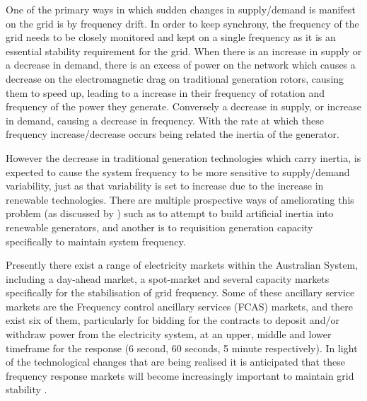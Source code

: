 One of the primary ways in which sudden changes in supply/demand is manifest on the grid is by frequency drift.
In order to keep synchrony, the frequency of the grid needs to be closely monitored and kept on a single frequency as it is an essential stability requirement for the grid.
When there is an increase in supply or a decrease in demand, there is an excess of power on the network which causes a decrease on the electromagnetic drag on traditional generation rotors, causing them to speed up, leading to a increase in their frequency of rotation and frequency of the power they generate.
Conversely a decrease in supply, or increase in demand, causing a decrease in frequency. With the rate at which these frequency increase/decrease occurs being related the inertia of the generator.

However the decrease in traditional generation technologies which carry inertia, is expected to cause the system frequency to be more sensitive to supply/demand variability, just as that variability is set to increase due to the increase in renewable technologies.
There are multiple prospective ways of ameliorating this problem (as discussed by \cite{doi:10.1002/2050-7038.12128}) such as to attempt to build artificial inertia into renewable generators, and another is to requisition generation capacity specifically to maintain system frequency.

Presently there exist a range of electricity markets within the Australian System, including a day-ahead market, a spot-market and several capacity markets specifically for the stabilisation of grid frequency.
Some of these ancillary service markets are the Frequency control ancillary services (FCAS) markets, and there exist six of them, particularly for bidding for the contracts to deposit and/or withdraw power from the electricity system, at an upper, middle and lower timeframe for the response (6 second, 60 seconds, 5 minute respectively).
In light of the technological changes that are being realised it is anticipated that these frequency response markets will become increasingly important to maintain grid stability \citep{RIESZ201586}.

